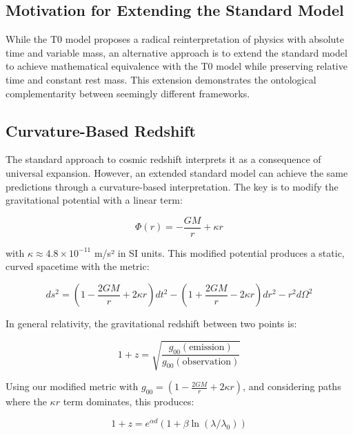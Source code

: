\documentclass[twocolumn,aps,prl]{revtex4-2}
\begin{document}
	\subsection{Motivation for Extending the Standard Model}
	\label{subsec:extended_sm_motivation}
	
	While the T0 model proposes a radical reinterpretation of physics with absolute time and variable mass, an alternative approach is to extend the standard model to achieve mathematical equivalence with the T0 model while preserving relative time and constant rest mass. This extension demonstrates the ontological complementarity between seemingly different frameworks.
	
	\subsection{Curvature-Based Redshift}
	\label{subsec:curvature_redshift}
	
	The standard approach to cosmic redshift interprets it as a consequence of universal expansion. However, an extended standard model can achieve the same predictions through a curvature-based interpretation. The key is to modify the gravitational potential with a linear term:
	
	\begin{equation}
		\Phi(r) = -\frac{GM}{r} + \kappa r
		\label{eq:modified_potential_sm}
	\end{equation}
	
	with \(\kappa \approx 4.8 \times 10^{-11}\) m/s² in SI units. This modified potential produces a static, curved spacetime with the metric:
	
	\begin{equation}
		ds^2 = (1 - \frac{2GM}{r} + 2\kappa r)dt^2 - (1 + \frac{2GM}{r} - 2\kappa r)dr^2 - r^2d\Omega^2
		\label{eq:modified_metric}
	\end{equation}
	
	In general relativity, the gravitational redshift between two points is:
	
	\begin{equation}
		1 + z = \sqrt{\frac{g_{00}(\text{emission})}{g_{00}(\text{observation})}}
		\label{eq:gravitational_redshift}
	\end{equation}
	
	Using our modified metric with \(g_{00} = (1 - \frac{2GM}{r} + 2\kappa r)\), and considering paths where the \(\kappa r\) term dominates, this produces:
	
	\begin{equation}
		1 + z = e^{\alpha d}(1 + \beta \ln(\lambda/\lambda_0))
		\label{eq:extended_sm_redshift}
	\end{equation}
	
\end{document}
